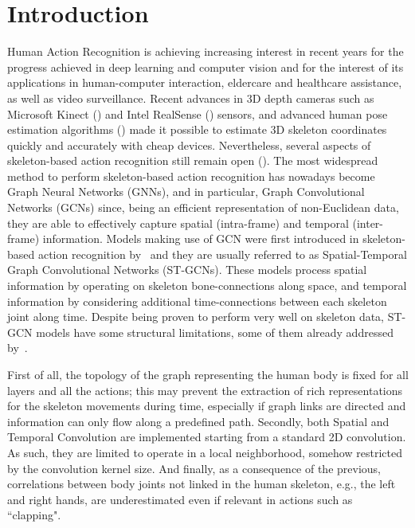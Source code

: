 \documentclass[times,twocolumn,final,authoryear]{elsarticle}
\begin{document}
\section{Introduction}
Human Action Recognition is achieving increasing interest in recent years for the progress achieved in deep learning and computer vision and for the interest of its applications in human-computer interaction, eldercare and healthcare assistance, as well as video surveillance. 
Recent advances in 3D depth cameras such as Microsoft Kinect (\cite{zhang2012microsoft}) and Intel RealSense (\cite{Keselman_2017_CVPR_Workshops}) sensors, and advanced human pose estimation algorithms (\cite{openpose}) made it possible to estimate 3D skeleton coordinates quickly and accurately with cheap devices. Nevertheless, several aspects of skeleton-based action recognition still remain open (\cite{a-comprehensive-survey,human-activity,a-survey}). 
The most widespread method to perform skeleton-based action recognition has nowadays become Graph Neural Networks (GNNs), and in particular, Graph Convolutional Networks (GCNs) since, being an efficient representation of non-Euclidean data, they are able to effectively capture spatial (intra-frame) and temporal  (inter-frame) information. Models making use of GCN were first introduced in skeleton-based action recognition by~\cite{yan2018spatial} and they are usually referred to as Spatial-Temporal Graph Convolutional Networks (ST-GCNs). These models process spatial information by operating on skeleton bone-connections along space, and temporal information by considering additional time-connections between each skeleton joint along time. Despite being proven to perform very well on skeleton data, ST-GCN models have some structural limitations, some of them already addressed by~\cite{dirgraph,2s-cnn,shift,disent}.

First of all, the topology of the graph representing the human body is fixed for all layers and all the actions; this may prevent the extraction of rich representations for the skeleton movements during time, especially if graph links are directed and information can only flow along a predefined path. Secondly, both Spatial and Temporal Convolution are implemented starting from a standard 2D convolution. As such, they are limited to operate in a local neighborhood, somehow restricted by the convolution kernel size. And finally, as a consequence of the previous, correlations between body joints not linked in the human skeleton, e.g., the left and right hands, are underestimated even if relevant in actions such as ``clapping".
\end{document}
